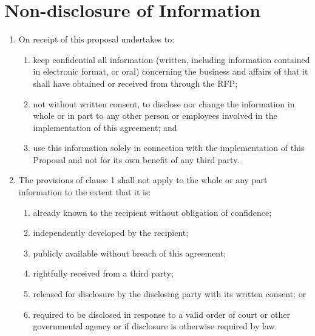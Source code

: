 \section{Non-disclosure of Information}
\begin{enumerate}
\item On receipt of this proposal \client undertakes to:
\begin{enumerate}
\item keep confidential all information (written, including information contained in electronic format, or oral) concerning the business and affairs of \vendor that it shall have obtained or received from \vendor through the RFP;
\item not without \vendors written consent, to disclose nor change the information in whole or in part to any other person or employees involved in the implementation of this agreement; and
\item use this information solely in connection with the implementation of this Proposal and not for its own benefit of any third party.
\end{enumerate}


\item The provisions of clause 1 shall not apply to the whole or any part information to the extent that it is:
\begin{enumerate}
 \item already known to the recipient without obligation of confidence;
 \item independently developed by the recipient;
 \item publicly available without breach of this agreement;
 \item rightfully received from a third party;
 \item released for disclosure by the disclosing party with its written consent; or
 \item required to be disclosed in response to a valid order of court or other governmental agency or if disclosure is otherwise required by law.
\end{enumerate}
\end{enumerate}
